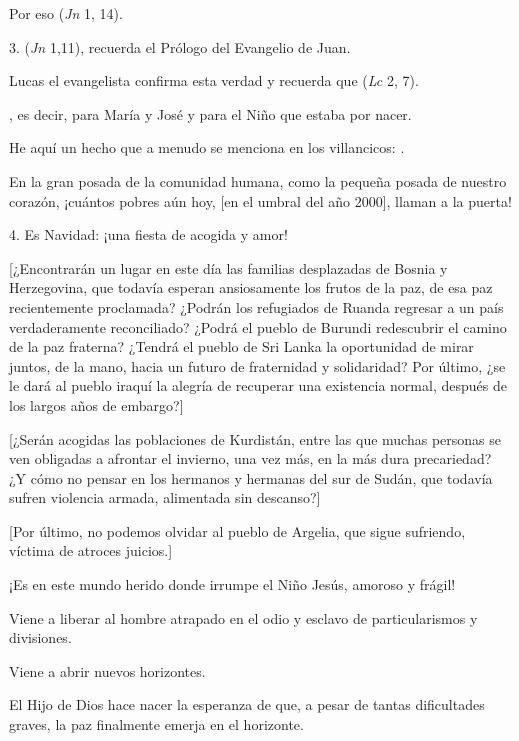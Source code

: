 \begin{body}
					Por eso  (\emph{Jn} 1, 14).
					
					3.  (\emph{Jn} 1,11), recuerda el Prólogo del Evangelio de Juan.
					
					Lucas el evangelista confirma esta verdad y recuerda que  (\emph{Lc} 2, 7).
					
					, es decir, para María y José y para el Niño que estaba por nacer.
					
					He aquí un hecho que a menudo se menciona en los villancicos: .
					
					En la gran posada de la comunidad humana, como la pequeña posada de nuestro corazón, ¡cuántos pobres aún hoy, {[}en el umbral del año 2000{]}, llaman a la puerta!
					
					4. Es Navidad: ¡una fiesta de acogida y amor!
					
					{[}¿Encontrarán un lugar en este día las familias desplazadas de Bosnia y Herzegovina, que todavía esperan ansiosamente los frutos de la paz, de esa paz recientemente proclamada? ¿Podrán los refugiados de Ruanda regresar a un país verdaderamente reconciliado? ¿Podrá el pueblo de Burundi redescubrir el camino de la paz fraterna? ¿Tendrá el pueblo de Sri Lanka la oportunidad de mirar juntos, de la mano, hacia un futuro de fraternidad y solidaridad? Por último, ¿se le dará al pueblo iraquí la alegría de recuperar una existencia normal, después de los largos años de embargo?{]}
					
					{[}¿Serán acogidas las poblaciones de Kurdistán, entre las que muchas personas se ven obligadas a afrontar el invierno, una vez más, en la más dura precariedad? ¿Y cómo no pensar en los hermanos y hermanas del sur de Sudán, que todavía sufren violencia armada, alimentada sin descanso?{]}
					
					{[}Por último, no podemos olvidar al pueblo de Argelia, que sigue sufriendo, víctima de atroces juicios.{]}
					
					¡Es en este mundo herido donde irrumpe el Niño Jesús, amoroso y frágil!
					
					Viene a liberar al hombre atrapado en el odio y esclavo de particularismos y divisiones.
					
					Viene a abrir nuevos horizontes.
					
					El Hijo de Dios hace nacer la esperanza de que, a pesar de tantas dificultades graves, la paz finalmente emerja en el horizonte.
					

\end{body}
